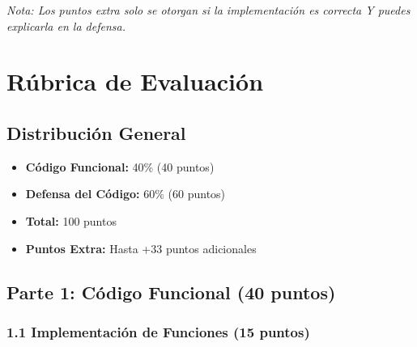 \documentclass[12pt,a4paper]{article}
\begin{document}
\textit{Nota: Los puntos extra solo se otorgan si la implementación es correcta Y puedes explicarla en la defensa.}

\newpage

\section{Rúbrica de Evaluación}

\subsection{Distribución General}

\begin{itemize}
    \item \textbf{Código Funcional:} 40\% (40 puntos)
    \item \textbf{Defensa del Código:} 60\% (60 puntos)
    \item \textbf{Total:} 100 puntos
    \item \textbf{Puntos Extra:} Hasta +33 puntos adicionales
\end{itemize}

\subsection{Parte 1: Código Funcional (40 puntos)}

\subsubsection{1.1 Implementación de Funciones (15 puntos)}
\end{document}
